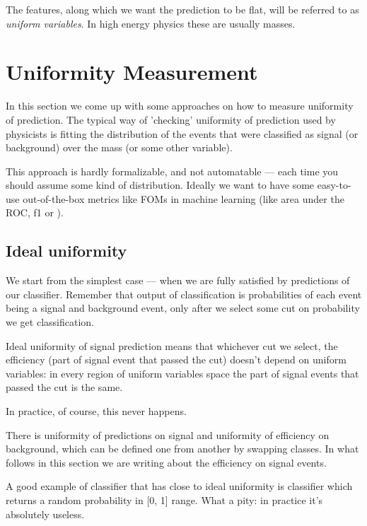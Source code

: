 \documentclass{JINST}
\theoremstyle{definition}
\theoremstyle{remark}
\begin{document}
The features, along which we want the prediction to be flat, will be referred to as 
\textit{uniform variables}. In high energy physics these are usually masses.

\section{Uniformity Measurement}

In this section we come up with some approaches on how to measure uniformity of prediction. The typical way of 'checking' uniformity of prediction used by physicists 
is fitting the distribution of the events that were classified as signal (or background) over the mass (or some other variable).

This approach is hardly formalizable, and not automatable --- each time you should assume some kind of distribution. 
Ideally we want to have some easy-to-use out-of-the-box metrics like FOMs in machine learning (like area under the ROC, f1 or ).

\subsection{Ideal uniformity}

We start from the simplest case --- when we are fully satisfied by predictions of our classifier. Remember that output of 
classification is probabilities of each event being a signal and background event, only after we select some cut on probability we get classification.

Ideal uniformity of signal prediction means that whichever cut we select, the efficiency (part of signal event that passed the cut) doesn't depend on uniform variables: 
in every region of uniform variables space the part of signal events that passed the cut is the same.

In practice, of course, this never happens.

There is uniformity of predictions on signal and uniformity of efficiency on background, which can be defined one from another by swapping classes. 
In what follows in this section we are writing about the efficiency on signal events.

A good example of classifier that has close to ideal uniformity is classifier which returns a random probability in [0, 1] range. What a pity: in practice it's absolutely useless.

\end{document}
